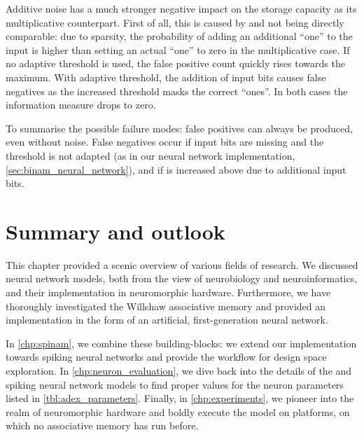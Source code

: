 Additive noise has a much stronger negative impact on the storage capacity as its multiplicative counterpart. First of all, this is caused by \pFp and \pFn not being directly comparable: due to sparsity, the probability of adding an additional \enquote{one} to the input is higher than setting an actual \enquote{one} to zero in the multiplicative case. If no adaptive threshold is used, the false positive count quickly rises towards the maximum. With adaptive threshold, the addition of input bits causes false negatives as the increased threshold masks the correct \enquote{ones}. In both cases the information measure \info drops to zero.

To summarise the possible \BiNAM failure modes: false positives can always be produced, even without noise. False negatives occur if input bits are missing and the threshold is not adapted (as in our neural network implementation, \cref{sec:binam_neural_network}), and if \threshold is increased above \nOnesIn due to additional input bits.


\section{Summary and outlook}

This chapter provided a scenic overview of various fields of research. We discussed neural network models, both from the view of neurobiology and neuroinformatics, and their implementation in neuromorphic hardware. Furthermore, we have thoroughly investigated the Willshaw associative memory and provided an implementation in the form of an artificial, first-generation neural network.

In \cref{chp:spinam}, we combine these building-blocks: we extend our \BiNAM implementation towards spiking neural networks and provide the workflow for design space exploration. In \cref{chp:neuron_evaluation}, we dive back into the details of the \LIF and \AdEx spiking neural network models to find proper values for the neuron parameters listed in \cref{tbl:adex_parameters}. Finally, in \cref{chp:experiments}, we pioneer into the realm of neuromorphic hardware and boldly execute the model on platforms, on which no associative memory has run before.
